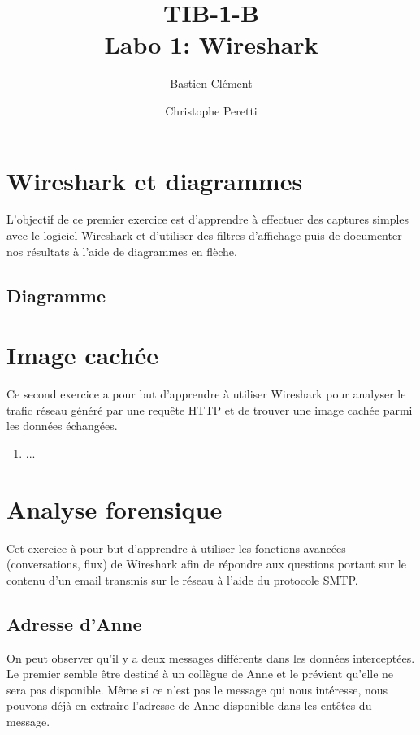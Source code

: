 \documentclass[11pt,a4paper]{article}
\title{TIB-1-B \\ Labo 1: Wireshark}
\author{Bastien Clément \and Christophe Peretti}
\begin{document}
\maketitle

\section{Wireshark et diagrammes}

L'objectif de ce premier exercice est d'apprendre à effectuer des captures simples avec le logiciel Wireshark et d'utiliser des filtres d'affichage puis de documenter nos résultats à l'aide de diagrammes en flèche.

\subsection{Diagramme}

\section{Image cachée}

Ce second exercice a pour but d'apprendre à utiliser Wireshark pour analyser le trafic réseau généré par une requête HTTP et de trouver une image cachée parmi les données échangées.

\begin{enumerate}
  \item ...
\end{enumerate}


\section{Analyse forensique}

Cet exercice à pour but d'apprendre à utiliser les fonctions avancées (conversations, flux) de Wireshark afin de répondre aux questions portant sur le contenu d'un email transmis sur le réseau à l'aide du protocole SMTP.

\subsection{Adresse d'Anne}

On peut observer qu'il y a deux messages différents dans les données interceptées. Le premier semble être destiné à un collègue de Anne et le prévient qu'elle ne sera pas disponible. Même si ce n'est pas le message qui nous intéresse, nous pouvons déjà en extraire l'adresse de Anne disponible dans les entêtes du message.
\end{document}
